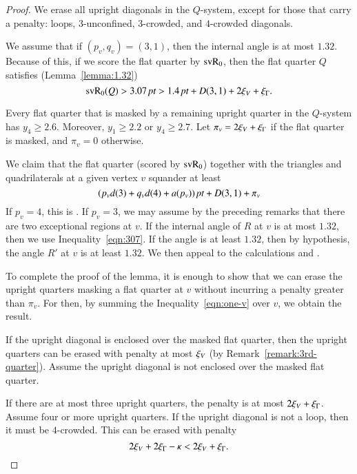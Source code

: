 \begin{proof}   We erase all upright diagonals in the
$Q$-system, except for those that carry a penalty: loops,
$3$-unconfined, $3$-crowded, and $4$-crowded diagonals.

We assume that if $(p_v,q_v)=(3,1)$, then the internal angle is at
most $1.32$. Because of this, if we score the flat quarter by
${\operatorname{svR}}_0$, then the flat quarter $Q$ satisfies
(Lemma~\ref{lemma:1.32})
   \begin{equation}
   {\operatorname{svR}}_0(Q) > 3.07\,\hbox{\it pt} > 1.4\,\hbox{\it pt} + D(3,1) + 2\xi_V + \xi_\Gamma.
   \label{eqn:307}
   \end{equation}



Every flat quarter that is masked by a remaining upright quarter
in the $Q$-system has $y_4\ge2.6$.  Moreover, $y_1\ge2.2$ or
$y_4\ge2.7$.  Let $\pi_v = 2\xi_V + \xi_\Gamma$ if the flat quarter is
masked, and $\pi_v = 0$ otherwise.

We claim that the flat quarter (scored by ${\operatorname{svR}}_0$) together with
the triangles and quadrilaterals at a given vertex $v$ squander at
least
   \begin{equation}
   (p_v d(3) + q_v d(4) + a(p_v))\,\hbox{\it pt} + D(3,1) + \pi_v
   \label{eqn:one-v}
   \end{equation}
If $p_v=4$, this is .  If $p_v=3$, we may assume
by the preceding remarks that there are two exceptional regions at
$v$.  If the internal angle of $R$ at $v$ is at most $1.32$, then
we use Inequality~\ref{eqn:307}.  If the angle is at least $1.32$,
then by hypothesis, the angle $R'$ at $v$ is at least $1.32$.  We
then appeal to the calculations  and
.

To complete the proof of the lemma, it is enough to show that we
can erase the upright quarters masking a flat quarter at $v$
without incurring a penalty greater than $\pi_v$.  For then, by
summing the Inequality~\ref{eqn:one-v} over $v$, we obtain the
result.

If the upright diagonal is enclosed over the masked flat quarter,
then the upright quarters can be erased with penalty at most
$\xi_V$ (by Remark~\ref{remark:3rd-quarter}). Assume the upright
diagonal is not enclosed over the masked flat quarter.

If there are at most three upright quarters, the penalty is at
most $2\xi_V + \xi_\Gamma$.  Assume four or more upright quarters.  If
the upright diagonal is not a loop, then it must be $4$-crowded.
This can be erased with penalty
   $$2\xi_V + 2\xi_\Gamma - \kappa < 2\xi_V + \xi_\Gamma.$$


\end{proof}
